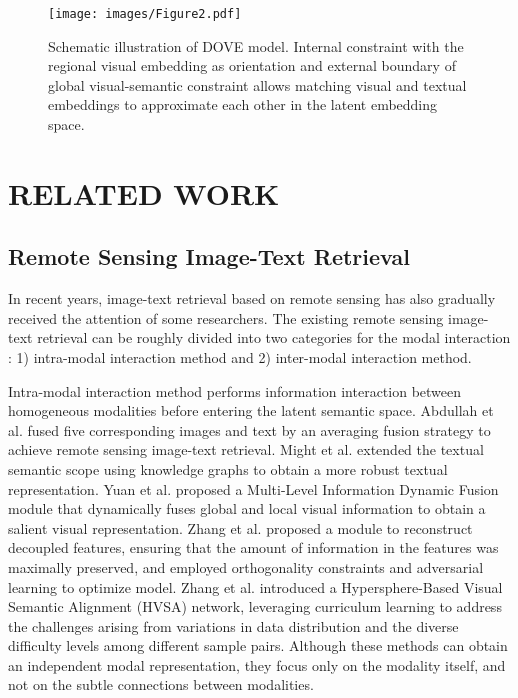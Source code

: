 \documentclass[journal]{IEEEtran}
\begin{document}
\begin{figure*}[ht]
  \centering
  \texttt{[image: images/Figure2.pdf]}
  \caption{Schematic illustration of DOVE model. Internal constraint with the regional visual embedding as orientation and external boundary of global visual-semantic constraint allows matching visual and textual embeddings to approximate each other in the latent embedding space.}
  \label{fig:fig2}
\end{figure*}
\section{RELATED WORK}
\subsection{Remote Sensing Image-Text Retrieval}
In recent years, image-text retrieval based on remote sensing has also gradually received the attention of some researchers. The existing remote sensing image-text retrieval can be roughly divided into two categories for the modal interaction \cite{qu2021dynamic}: 1) intra-modal interaction method and 2) inter-modal interaction method.

Intra-modal interaction method \cite{abdullah2020textrs, mi2022knowledge, yuan2022remote, zhang2022transformer, zhang2023hypersphere} performs information interaction between homogeneous modalities before entering the latent semantic space. Abdullah et al. \cite{abdullah2020textrs} fused five corresponding images and text by an averaging fusion strategy to achieve remote sensing image-text retrieval. Might et al. \cite{mi2022knowledge} extended the textual semantic scope using knowledge graphs to obtain a more robust textual representation. Yuan et al. \cite{yuan2022remote} proposed a Multi-Level Information Dynamic Fusion module that dynamically fuses global and local visual information to obtain a salient visual representation. Zhang et al. \cite{zhang2022transformer} proposed a  module to reconstruct decoupled features, ensuring that the amount of information in the features was maximally preserved, and employed orthogonality constraints and adversarial learning to optimize model. Zhang et al. \cite{zhang2023hypersphere} introduced a Hypersphere-Based Visual Semantic Alignment (HVSA) network, leveraging curriculum learning to address the challenges arising from variations in data distribution and the diverse difficulty levels among different sample pairs. Although these methods can obtain an independent modal representation, they focus only on the modality itself, and not on the subtle connections between modalities.
\end{document}
